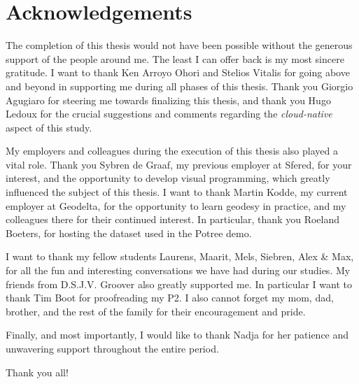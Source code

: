 
\chapter*{Acknowledgements}

The completion of this thesis would not have been possible without the generous support of the people around me. 
The least I can offer back is my most sincere gratitude.
I want to thank Ken Arroyo Ohori and Stelios Vitalis for going above and beyond in supporting me during all phases of this thesis. 
Thank you Giorgio Agugiaro for steering me towards finalizing this thesis, and thank you Hugo Ledoux for the crucial suggestions and comments regarding the \emph{cloud-native} aspect of this study.

My employers and colleagues during the execution of this thesis also played a vital role. 
Thank you Sybren de Graaf, my previous employer at Sfered, for your interest, and the opportunity to develop visual programming, which greatly influenced the subject of this thesis.
I want to thank Martin Kodde, my current employer at Geodelta, for the opportunity to learn geodesy in practice, and my colleagues there for their continued interest. 
In particular, thank you Roeland Boeters, for hosting the dataset used in the Potree demo.

I want to thank my fellow students Laurens, Maarit, Mels, Siebren, Alex \& Max, for all the fun and interesting conversations we have had during our studies. 
My friends from D.S.J.V. Groover also greatly supported me. In particular I want to thank Tim Boot for proofreading my P2. I also cannot forget my mom, dad, brother, and the rest of the family for their encouragement and pride. 

Finally, and most importantly, I would like to thank Nadja for her patience and unwavering support throughout the entire period.

Thank you all!

